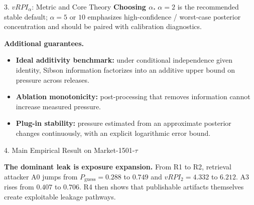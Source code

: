 \documentclass[final]{article}
\newcommand{\fsBody}{\fontsize{25}{29}}   %
\newcommand{\fsSmall}{\fontsize{20}{24}}  %
\newcommand{\smallbody}{\fsBody\selectfont}
\newcommand{\tablefont}{\fsSmall\selectfont}
\newcommand{\mhead}[1]{\textbf{\color{navy}#1}}
\begin{document}
\begin{minipage}[t]{\textwidth}
\begin{minipage}[t]{0.292\textwidth}
\begin{sectionbox}{3. $vRPI_\alpha$: Metric and Core Theory}
\vspace{0.0317in}
\mhead{Choosing $\alpha$.} $\alpha=2$ is the recommended stable default; $\alpha=5$ or $10$ emphasizes high-confidence / worst-case posterior concentration and should be paired with calibration diagnostics.

\vspace{0.0476in}
\mhead{Additional guarantees.}
\begin{itemize}
  \item \textbf{Ideal additivity benchmark:} under conditional independence given identity, Sibson information factorizes into an additive upper bound on pressure across releases.
  \item \textbf{Ablation monotonicity:} post-processing that removes information cannot increase measured pressure.
  \item \textbf{Plug-in stability:} pressure estimated from an approximate posterior changes continuously, with an explicit logarithmic error bound.
\end{itemize}
\end{sectionbox}
\end{minipage}\hfill
\begin{minipage}[t]{0.388\textwidth}
\vspace{0pt}

\begin{sectionbox}{4. Main Empirical Result on Market-1501-$\tau$}
\begin{resultbox}
\smallbody
\textbf{The dominant leak is exposure expansion.} From R1 to R2, retrieval attacker A0 jumps from $P_{\mathrm{guess}}=0.288$ to $0.749$ and $vRPI_2=4.332$ to $6.212$. A3 rises from $0.407$ to $0.706$. R4 then shows that publishable artifacts themselves create exploitable leakage pathways.
\end{resultbox}
\vspace{0.0714in}
{\tablefont
\renewcommand{\arraystretch}{1.14}
\setlength{\tabcolsep}{5.0pt}
}
\vspace{0.0317in}


\end{sectionbox}
\end{minipage}
\end{minipage}
\end{document}
